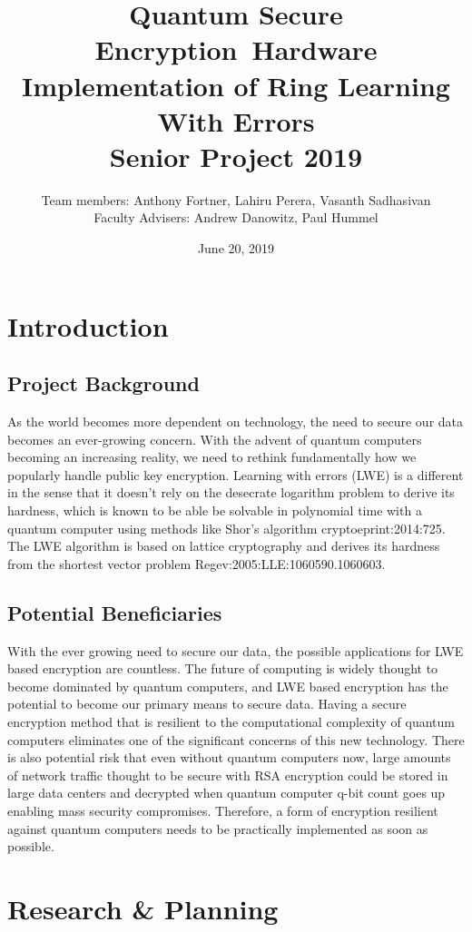 \documentclass{article}
\title{Quantum Secure Encryption\ Hardware Implementation of Ring Learning With Errors\\ Senior Project 2019}
\date{June 20, 2019}
\author{Team members: Anthony Fortner, Lahiru Perera, Vasanth Sadhasivan \\ Faculty Advisers: Andrew Danowitz, Paul Hummel}
\begin{document}
\maketitle
\newpage
{}
  
\tableofcontents
\newpage

\section{Introduction}
\subsection{Project Background}
As the world becomes more dependent on technology, the need to secure our data becomes an ever-growing concern. With the advent of quantum computers becoming an increasing reality, we need to rethink fundamentally how we popularly handle public key encryption. Learning with errors (LWE) is a different in the sense that it doesn’t rely on the desecrate logarithm problem to derive its hardness, which is known to be able be solvable in polynomial time with a quantum computer using methods like Shor’s algorithm {cryptoeprint:2014:725}. The LWE algorithm is based on lattice cryptography and derives its hardness from the shortest vector problem {Regev:2005:LLE:1060590.1060603}. 

\subsection{Potential Beneficiaries}
With the ever growing need to secure our data, the possible applications for LWE based encryption are countless. The future of computing is widely thought to become dominated by quantum computers, and LWE based encryption has the potential to become our primary means to secure data. Having a secure encryption method that is resilient to the computational complexity of quantum computers eliminates one of the significant concerns of this new technology. There is also potential risk that even without quantum computers now, large amounts of network traffic thought to be secure with RSA encryption could be stored in large data centers and decrypted when quantum computer q-bit count goes up enabling mass security compromises. Therefore, a form of encryption resilient against quantum computers needs to be practically implemented as soon as possible. 

\section{Research \& Planning}
\end{document}
